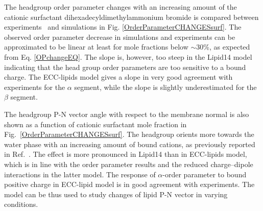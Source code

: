 \documentclass[aip,jcp,twocolumn]{revtex4}
\begin{document}
%

The headgroup order parameter changes with an increasing amount of 
the cationic surfactant dihexadecyldimethylammonium bromide 
is compared between experiments~\cite{scherer89} and simulations in
Fig. \ref{OrderParameterCHANGESsurf}. 
The observed order parameter decrease in simulations and experiments
can be approximated to be linear at least for mole fractions
below $\sim$30\%, as expected from Eq. \ref{OPchangeEQ}.
The slope is, however, too steep in the Lipid14 model indicating that 
the head group order parameters are too sensitive to a bound charge.
The ECC-lipids model gives a slope in very good agreement with experiments
for the $\alpha$ segment, while the slope is slightly
underestimated for the $\beta$ segment.

The headgroup P-N vector angle with respect to the membrane normal
is also shown as a function of cationic surfactant mole fraction
in Fig.~\ref{OrderParameterCHANGESsurf}.
The headgroup orients more towards the water phase with an increasing
amount of bound cations, as previously reported in Ref.~. 
The effect is more pronounced in Lipid14 than 
in ECC-lipids model, which is in line with the order parameter 
results and the reduced charge--dipole interactions in the latter model.
The response of $\alpha$-order parameter to bound positive charge
in ECC-lipid model is in good agreement with experiments.
The model can be thus used to study changes of lipid P-N vector
in varying conditions.
\end{document}
